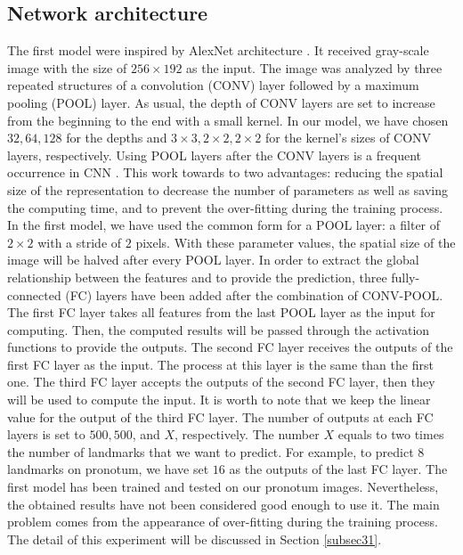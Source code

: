 \documentclass[review]{elsarticle}
\begin{document}
\subsection{Network architecture}
\label{subsec22}
The first model were inspired by AlexNet architecture \cite{krizhevsky2012imagenet}. It received gray-scale image with the size of $256 \times 192$ as the input. The image was analyzed by three repeated structures of a convolution (CONV) layer followed by a maximum pooling (POOL) layer. As usual, the depth of CONV layers are set to increase from the beginning to the end with a small kernel. In our model, we have chosen $32, 64, 128 $ for the depths and $ 3 \times 3, 2 \times 2, 2 \times 2 $ for the kernel's sizes of CONV layers, respectively. Using POOL layers after the CONV layers is a frequent occurrence in CNN \cite{krizhevsky2012imagenet, ciregan2012multi, cintas2016automatic}. This work towards to two advantages: reducing the spatial size of the representation to decrease the number of parameters as well as saving the computing time, and to prevent the over-fitting during the training process. In the first model, we have used the common form for a POOL layer: a filter of $2 \times 2$ with a stride of $2$ pixels. With these parameter values, the spatial size of the image will be halved after every POOL layer. In order to extract the global relationship between the features and to provide the prediction, three fully-connected (FC) layers have been added after the combination of CONV-POOL. The first FC layer takes all features from the last POOL layer as the input for computing. Then, the computed results will be passed through the activation functions to provide the outputs. The second FC layer receives the outputs of the first FC layer as the input. The process at this layer is the same than the first one. The third FC layer accepts the outputs of the second FC layer, then they will be used to compute the input. It is worth to note that we keep the linear value for the output of the third FC layer. The number of outputs at each FC layers is set to $500, 500$, and $X$, respectively. The number $X$ equals to two times the number of landmarks that we want to predict. For example, to predict $8$ landmarks on pronotum, we have set $16$ as the outputs of the last FC layer. The first model has been trained and tested on our pronotum images. Nevertheless, the obtained results have not been considered good enough to use it. The main problem comes from the appearance of over-fitting during the training process. The detail of this experiment will be discussed in Section \ref{subsec31}.
\end{document}
